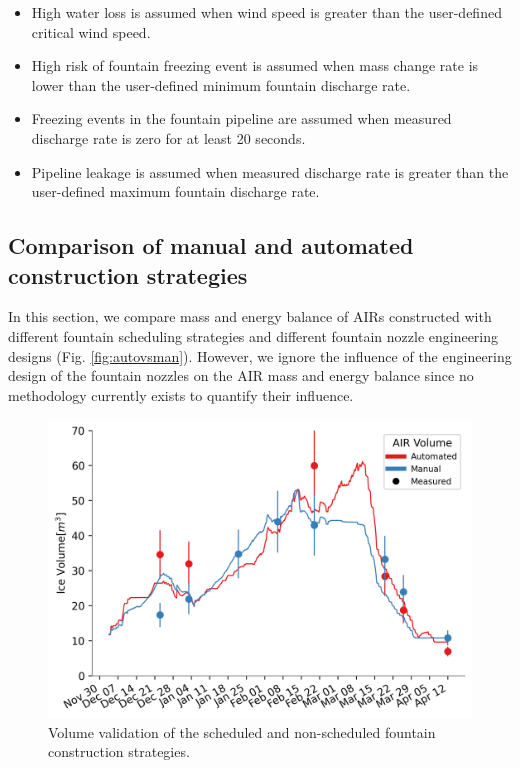 \begin{itemize}

	\item High water loss is assumed when wind speed is greater than the user-defined critical wind speed.

	\item High risk of fountain freezing event is assumed when mass change rate is lower than the user-defined minimum fountain discharge rate.

	\item Freezing events in the fountain pipeline are assumed when measured discharge rate is zero for at least
    20 seconds.

	\item Pipeline leakage is assumed when measured discharge rate is greater than the user-defined maximum fountain discharge rate.

\end{itemize}

\subsection{Comparison of manual and automated construction strategies}

In this section, we compare mass and energy balance of AIRs constructed with different fountain scheduling
strategies and different fountain nozzle engineering designs (Fig. \ref{fig:autovsman}). However, we ignore the
influence of the engineering design of the fountain nozzles on the AIR mass and energy balance since no
methodology currently exists to quantify their influence.

\begin{figure}[htb] \includegraphics[width=\textwidth] {figs/CH_validation.png} \caption{Volume validation of the
		scheduled and non-scheduled fountain construction strategies.} \label{fig:validation} \end{figure}

